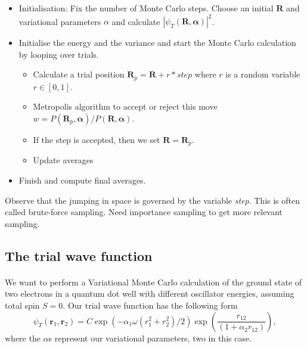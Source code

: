 \documentclass[%
oneside,                 %
final,                   %
10pt]{article}
\begin{document}
\begin{itemize}
   \item Initialisation: Fix the number of Monte Carlo steps. Choose an initial $\bm{R}$ and variational parameters $\alpha$ and calculate $\left|\psi_T(\bm{R},\bm{\alpha})\right|^2$. 

   \item Initialise the energy and the variance and start the Monte Carlo calculation by looping over trials.
\begin{itemize}

      \item Calculate  a trial position  $\bm{R}_p=\bm{R}+r*step$ where $r$ is a random variable $r \in [0,1]$.

      \item Metropolis algorithm to accept or reject this move  $w = P(\bm{R}_p,\bm{\alpha})/P(\bm{R},\bm{\alpha})$.

      \item If the step is accepted, then we set $\bm{R}=\bm{R}_p$. 

      \item Update averages

\end{itemize}

\noindent
   \item Finish and compute final averages.
\end{itemize}

\noindent
Observe that the jumping in space is governed by the variable \emph{step}. This is often called brute-force sampling.
Need importance sampling to get more relevant sampling.



\subsection{The trial wave function}

\paragraph{}
We want to perform  a Variational Monte Carlo calculation of the ground state of two electrons in a quantum dot well with different oscillator energies, assuming total spin $S=0$.
Our trial wave function has the following form
\begin{equation}
   \psi_{T}(\bm{r}_1,\bm{r}_2) = 
   C\exp{\left(-\alpha_1\omega(r_1^2+r_2^2)/2\right)}
   \exp{\left(\frac{r_{12}}{(1+\alpha_2 r_{12})}\right)}, 
\label{eq:trial}
\end{equation}
where the $\alpha$s represent our variational parameters, two in this case.
\end{document}
